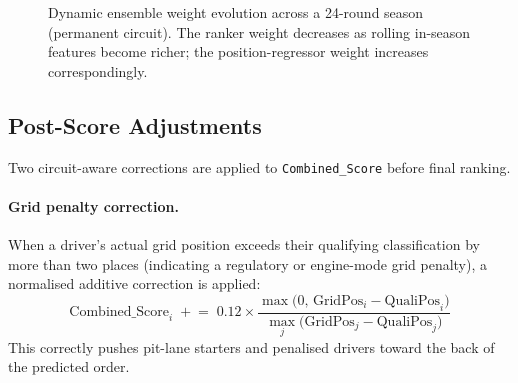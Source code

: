 \documentclass[12pt, a4paper, oneside]{report}
\begin{document}
\begin{figure}[H]
\centering
{}
\caption{Dynamic ensemble weight evolution across a 24-round season (permanent circuit).
  The ranker weight decreases as rolling in-season features become richer;
  the position-regressor weight increases correspondingly.}
\label{fig:ensemble-weights}
\end{figure}

\subsection{Post-Score Adjustments}
\label{subsec:adjustments}

Two circuit-aware corrections are applied to \texttt{Combined\_Score} before
final ranking.

\paragraph{Grid penalty correction.}
When a driver's actual grid position exceeds their qualifying classification by
more than two places (indicating a regulatory or engine-mode grid penalty), a
normalised additive correction is applied:
\[
\text{Combined\_Score}_i \;\mathrel{+}=\;
  0.12 \times
  \frac{\max\bigl(0,\,\text{GridPos}_i - \text{QualiPos}_i\bigr)}%
       {\max_j\bigl(\text{GridPos}_j - \text{QualiPos}_j\bigr)}
\]
This correctly pushes pit-lane starters and penalised drivers toward the back
of the predicted order.
\end{document}
